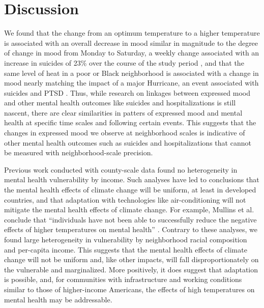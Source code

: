 \documentclass[9pt,twocolumn,twoside,lineno]{pnas-new}
\begin{document}
\section*{Discussion}
We found that the change from an optimum temperature to a higher temperature is associated with an overall decrease in mood similar in magnitude to the degree of change in mood from Monday to Saturday, a weekly change associated with an increase in suicides of 23\% over the course of the study period \cite{CDC2021}, and that the same level of heat in a poor or Black neighborhood is associated with a change in mood nearly matching the impact of a major Hurricane, an event associated with suicides and PTSD \cite{Schwartz2017Aug, Lieberman-Cribbin2017}.  Thus, while research on linkages between expressed mood and other mental health outcomes like suicides and hospitalizations is still nascent, there are clear similarities in patters of expressed mood and mental health at specific time scales and following certain events.  This suggests that the changes in expressed mood we observe at neighborhood scales is indicative of other mental health outcomes such as suicides and hospitalizations that cannot be measured with neighborhood-scale precision.

Previous work conducted with county-scale data found no heterogeneity in mental health vulnerability by income. Such analyses have led to conclusions that the mental health effects of climate change will be uniform, at least in developed countries, and that adaptation with technologies like air-conditioning will not mitigate the mental health effects of climate change. For example, Mullins et al. conclude that ``individuals have not been able to successfully reduce the negative effects of higher temperatures on mental health'' \cite{Mullins2019Dec}. Contrary to these analyses, we found large heterogeneity in vulnerability by neighborhood racial composition and per-capita income. This suggests that the mental health effects of climate change will not be uniform and, like other impacts, will fall disproportionately on the vulnerable and marginalized. More positively, it does suggest that adaptation is possible, and, for communities with infrastructure and working conditions similar to those of higher-income Americans, the effects of high temperatures on mental health may be addressable.
\end{document}

